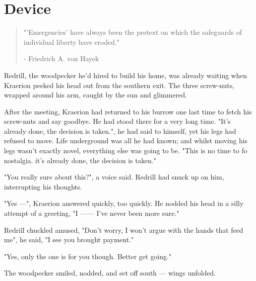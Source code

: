 \chapter{Device}

\vspace{-1.3cm}
\begin{localsize}{10}
	\begin{quote}
		"'Emergencies' have always been the pretext on which the safeguards of individual liberty have eroded."
		\begin{flushright}- Friedrich A. von Hayek\end{flushright}
	\end{quote} 
\end{localsize}
\vspace{1cm}

Redrill, the woodpecker he'd hired to build his home, was already waiting when Kraerion peeked his head out from the southern exit. The three screw-nuts, wrapped around his arm, caught by the sun and glimmered.

After the meeting, Kraerion had returned to his burrow one last time to fetch his screw-nuts and say goodbye. He had stood there for a very long time. 
"It's already done, the decision is taken.", he had said to himself, yet his legs had refused to move. Life underground was all he had known; and whilst moving his legs wasn't exactly novel, everything else was going to be. "This is no time to fo nostalgia. it's already done, the decision is taken."

"You really sure about this?", a voice said. Redrill had snuck up on him, interrupting his thoughts.

"Yes —", Kraerion answered quickly, too quickly. He nodded his head in a silly attempt of a greeting, "I —— I've never been more sure."

Redrill chuckled amused, "Don't worry, I won't argue with the hands that feed me", he said, "I see you brought payment."

"Yes, only the one is for you though. Better get going."

The woodpecker smiled, nodded, and set off south — wings unfolded.

